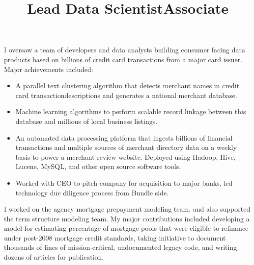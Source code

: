 \begin{resume}
\title{Lead Data Scientist}
\begin{position}
I oversaw a team of developers and data analysts building consumer facing data products based on billions of credit card transactions
from a major card issuer. Major achievements included:
\begin{itemize}
\item A parallel text clustering algorithm that detects merchant names in credit card transactiondescriptions and generates a national merchant database.
\item Machine learning algorithms to perform scalable record linkage between this database and millions of local business listings.
\item An automated data processing platform that ingests billions of financial transactions and multiple sources of merchant directory data 
on a weekly basis to power a merchant review website. Deployed using Hadoop, Hive, Lucene, MySQL, and other open source software tools.
\item Worked with CEO to pitch company for acquisition to major banks, led technology due diligence process from Bundle side.
\end{itemize}
\end{position}

\title{Associate}
\begin{position}
I worked on the agency mortgage prepayment modeling team, and also supported the term structure modeling team. 
My major contributions included developing a model for estimating percentage of mortgage pools that were eligible to refinance under post-2008 
mortgage credit standards, taking initiative to document thousands of lines of mission-critical, undocumented legacy code, 
and writing dozens of articles for publication. 



\end{position}
\end{resume}
